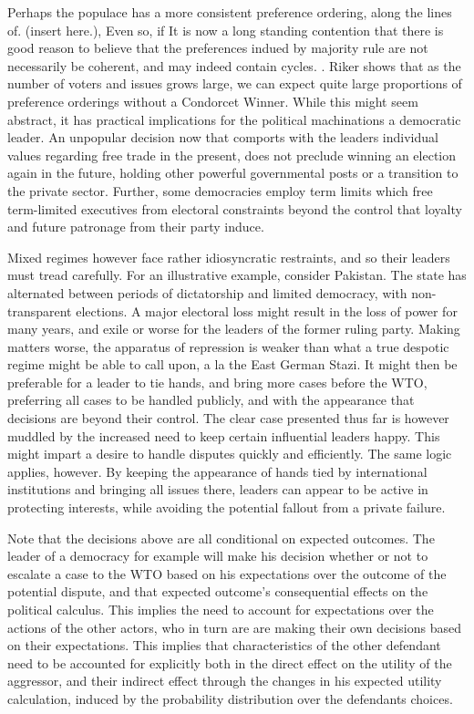\documentclass[]{article}
\begin{document}
 Perhaps the populace has a more consistent preference ordering, along the lines of. (insert here.), Even so, if It is now a long standing contention that  there is good reason to believe that the preferences indued by majority rule are not necessarily be coherent, and may indeed contain cycles. \cite{Arrow}. Riker shows that as the number of voters and issues grows large, we can expect quite large proportions of preference orderings without a Condorcet Winner. While this might seem abstract, it has practical implications for the political machinations a democratic leader. An unpopular decision now that comports with the leaders individual values regarding free trade in the present, does not preclude winning an election again in the future, holding other powerful governmental posts or a transition to the private sector. Further, some democracies employ term limits which free term-limited executives from electoral constraints beyond the control that loyalty and future patronage from their party induce.  

  Mixed regimes however face rather idiosyncratic restraints, and so their leaders must tread carefully. For an illustrative example, consider Pakistan. The state has alternated between periods of dictatorship and limited democracy, with non-transparent elections. A major electoral loss might result in the loss of power for many years, and exile or worse for the leaders of the former ruling party.  Making matters worse, the apparatus of repression is weaker than what a true despotic regime might be able to call upon, a la the East German Stazi. It might then be preferable for a leader to tie hands, and bring more cases before the WTO, preferring all cases to be handled publicly, and with the appearance that decisions are beyond their control. The clear case presented thus far is however muddled by the increased need to keep certain influential leaders happy. This might impart a desire to handle disputes quickly and efficiently. The same logic applies, however. By keeping the appearance of hands tied by international institutions and bringing all issues there, leaders can appear to be active in protecting interests, while avoiding the potential fallout from a private failure. 

 Note that the decisions above are all conditional on expected outcomes. The leader of a democracy for example will make his decision whether or not to escalate a case to the WTO based on his expectations over the outcome of the potential dispute, and that expected outcome's consequential effects on the political calculus. This implies the need to account for expectations over the actions of the other actors, who in turn are are making their own decisions based on their expectations. This implies that characteristics of the other defendant need to be accounted for explicitly both in the direct effect on the utility of the aggressor, and their indirect effect through the changes in his expected utility calculation, induced by the probability distribution over the defendants choices. 
\end{document}
